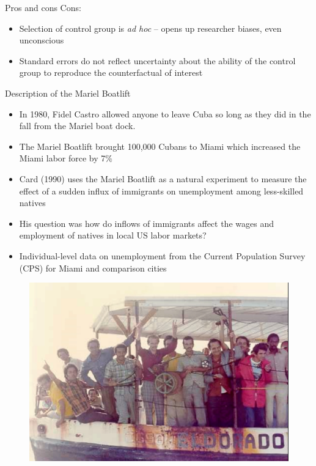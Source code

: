 \documentclass{beamer}
\begin{document}
\begin{frame}{Pros and cons}
	Cons:

		\begin{itemize}
		\item Selection of control group is \emph{ad hoc} -- opens up researcher biases, even unconscious
		\item Standard errors do not reflect uncertainty about the ability of the control group to reproduce the counterfactual of interest
		\end{itemize}
\end{frame}


\begin{frame}{Description of the Mariel Boatlift}
	
	\begin{itemize}
	\item In 1980, Fidel Castro allowed anyone to leave Cuba so long as they did in the fall from the Mariel boat dock.
	\item The Mariel Boatlift brought 100,000 Cubans to Miami which increased the Miami labor force by 7\%
	\item Card (1990) uses the Mariel Boatlift as a natural experiment to measure the effect of a sudden influx of immigrants on unemployment among less-skilled natives
	\item His question was how do inflows of immigrants affect the wages and employment of natives in local US labor markets?
	\item Individual-level data on unemployment from the Current Population Survey (CPS) for Miami and comparison cities
	\end{itemize}
\end{frame}


\begin{frame}[plain]
	\begin{figure}
	\includegraphics[scale=0.25]{./lecture_includes/boatlift2.png}
	\end{figure}
\end{frame}
\end{document}
